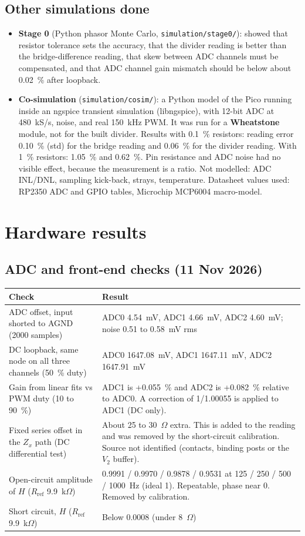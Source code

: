 \documentclass[11pt,a4paper]{article}
\newcommand{\Rref}{R_{\mathrm{ref}}}
\newcommand{\Zx}{Z_x}
\begin{document}
\subsection{Other simulations done}
\begin{itemize}
  \item \textbf{Stage 0} (Python phasor Monte Carlo, \texttt{simulation/stage0/}): showed that resistor tolerance sets the accuracy, that the divider reading is better than the bridge-difference reading, that skew between ADC channels must be compensated, and that ADC channel gain mismatch should be below about 0.02~\% after loopback.
  \item \textbf{Co-simulation} (\texttt{simulation/cosim/}): a Python model of the Pico running inside an ngspice transient simulation (libngspice), with 12-bit ADC at 480~kS/s, noise, and real 150~kHz PWM. It was run for a \textbf{Wheatstone} module, not for the built divider. Results with 0.1~\% resistors: reading error 0.10~\% (std) for the bridge reading and 0.06~\% for the divider reading. With 1~\% resistors: 1.05~\% and 0.62~\%. Pin resistance and ADC noise had no visible effect, because the measurement is a ratio. Not modelled: ADC INL/DNL, sampling kick-back, strays, temperature. Datasheet values used: RP2350 ADC and GPIO tables, Microchip MCP6004 macro-model.
\end{itemize}

\section{Hardware results}
\subsection{ADC and front-end checks (11 Nov 2026)}
\begin{center}
\small
\begin{tabular}{p{5.2cm}p{10.5cm}}
\toprule
Check & Result \\
\midrule
ADC offset, input shorted to AGND (2000 samples) & ADC0 4.54~mV, ADC1 4.66~mV, ADC2 4.60~mV; noise 0.51 to 0.58~mV rms \\
DC loopback, same node on all three channels (50~\% duty) & ADC0 1647.08~mV, ADC1 1647.11~mV, ADC2 1647.91~mV \\
Gain from linear fits vs PWM duty (10 to 90~\%) & ADC1 is +0.055~\% and ADC2 is +0.082~\% relative to ADC0. A correction of 1/1.00055 is applied to ADC1 (DC only). \\
Fixed series offset in the $\Zx$ path (DC differential test) & About 25 to 30~$\Omega$ extra. This is added to the reading and was removed by the short-circuit calibration. Source not identified (contacts, binding posts or the $V_2$ buffer). \\
Open-circuit amplitude of $H$ ($\Rref$ 9.9~k$\Omega$) & 0.9991 / 0.9970 / 0.9878 / 0.9531 at 125 / 250 / 500 / 1000~Hz (ideal 1). Repeatable, phase near 0. Removed by calibration. \\
Short circuit, $H$ ($\Rref$ 9.9~k$\Omega$) & Below 0.0008 (under 8~$\Omega$) \\
\bottomrule
\end{tabular}
\end{center}
\end{document}
